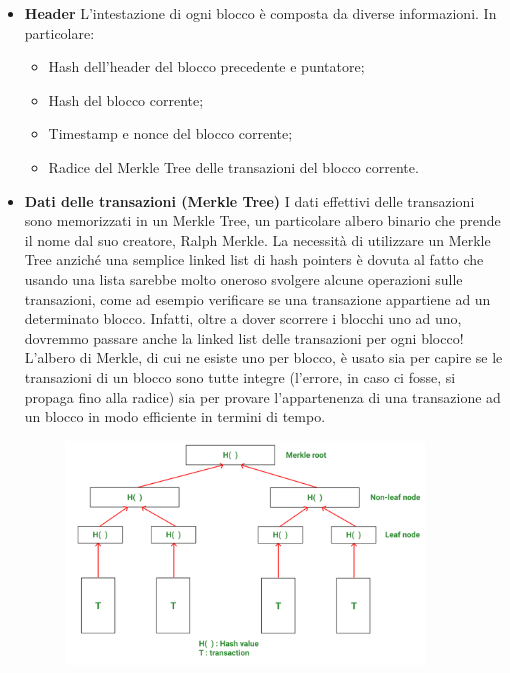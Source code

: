 \documentclass[12pt]{report}
\begin{document}
\begin{itemize}[topsep=5pt, itemsep=0pt]
    \item \textbf{Header}\newline
    L'intestazione di ogni blocco è composta da diverse informazioni. In particolare:
    \begin{itemize}[topsep=-2pt, itemsep=0pt, label={$-$}]
        \item Hash dell'header del blocco precedente e puntatore;
        \item Hash del blocco corrente;
        \item Timestamp e nonce del blocco corrente;
        \item Radice del Merkle Tree delle transazioni del blocco corrente.
    \end{itemize}
    \item \textbf{Dati delle transazioni (Merkle Tree)}\newline
    I dati effettivi delle transazioni sono memorizzati in un Merkle Tree, un particolare albero binario che prende il nome dal suo creatore, Ralph Merkle.\newline
    La necessità di utilizzare un Merkle Tree anziché una semplice linked list di hash pointers è dovuta al fatto che usando una lista sarebbe molto oneroso svolgere alcune operazioni sulle transazioni, come ad esempio verificare se una transazione appartiene ad un determinato blocco. Infatti, oltre a dover scorrere i blocchi uno ad uno, dovremmo passare anche la linked list delle transazioni per ogni blocco!\newline
    L'albero di Merkle, di cui ne esiste uno per blocco, è usato sia per capire se le transazioni di un blocco sono tutte integre (l'errore, in caso ci fosse, si propaga fino alla radice) sia per provare l'appartenenza di una transazione ad un blocco in modo efficiente in termini di tempo.\newline
    \begin{figure}[H]
        \centering
        \includegraphics[width=0.9\textwidth]{Merkle.png}

\end{figure}
\end{itemize}
\end{document}
